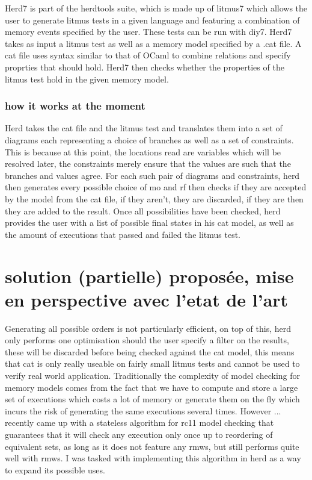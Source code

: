 \documentclass[a4]{article}
\begin{document}
Herd7 is part of the herdtools suite, which is made up of litmus7 which allows the user to generate litmus tests in a given language and featuring a combination of memory events specified by the user. These tests can be run with diy7. Herd7 takes as input a litmus test as well as a memory model specified by a .cat file. A cat file uses syntax similar to that of OCaml to combine relations and specify proprties that should hold. Herd7 then checks whether the properties of the litmus test hold in the given memory model.

\subsubsection{how it works at the moment}

Herd takes the cat file and the litmus test and translates them into a set of diagrams each representing a choice of branches as well as a set of constraints. This is because at this point, the locations read are variables which will be resolved later, the constraints merely ensure that the values are such that the branches and values agree. For each such pair of diagrams and constraints, herd then generates every possible choice of mo and rf then checks if they are accepted by the model from the cat file, if they aren't, they are discarded, if they are then they are added to the result. Once all possibilities have been checked, herd provides the user with a list of possible final states in his cat model, as well as the amount of executions that passed and failed the litmus test.

\section{solution (partielle) proposée, mise en perspective avec l'etat de l'art}

Generating all possible orders is not particularly efficient, on top of this, herd only performs one optimisation should the user specify a filter on the results, these will be discarded before being checked against the cat model, this means that cat is only really useable on fairly small litmus tests and cannot be used to verify real world application. Traditionally the complexity of model checking for memory models comes from the fact that we have to compute and store a large set of executions which costs a lot of memory or generate them on the fly which incurs the risk of generating the same executions several times. However ... recently came up with a stateless algorithm for rc11 model checking that guarantees that it will check any execution only once up to reordering of equivalent sets, as long as it does not feature any rmws, but still performs quite well with rmws. I was tasked with implementing this algorithm in herd as a way to expand its possible uses.
\end{document}
